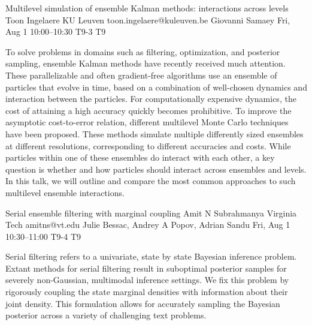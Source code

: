 \begin{talk}
  {Multilevel simulation of ensemble Kalman methods: interactions across levels}%
  {Toon Ingelaere}%
  {KU Leuven}%
  {toon.ingelaere@kuleuven.be}%
  {Giovanni Samaey}%
  {}%
  {Fri, Aug 1 10:00–10:30}%
  {T9-3}%
  {T9}%
  
				

        To solve problems in domains such as filtering, optimization, and posterior sampling,
        ensemble Kalman methods have recently received much attention. These parallelizable and often gradient-free algorithms use an ensemble of particles that evolve in time, based on a combination of well-chosen dynamics and interaction between the particles. For computationally expensive dynamics, the cost of attaining a high accuracy quickly becomes prohibitive. To improve the asymptotic cost-to-error relation, different multilevel Monte Carlo techniques have been proposed. These methods simulate multiple differently sized ensembles at different resolutions, corresponding to different accuracies and costs. While particles within one of these ensembles do interact with each other, a key question is whether and how particles should interact across ensembles and levels.
        In this talk, we will outline and compare the most common approaches to such multilevel ensemble interactions.

\medskip

\end{talk}

\begin{talk}
  {Serial ensemble filtering with marginal coupling}%
  {Amit N Subrahmanya}%
  {Virginia Tech}%
  {amitns@vt.edu}%
  {Julie Bessac, Andrey A Popov, Adrian Sandu}%
  {}%
  {Fri, Aug 1 10:30–11:00}%
  {T9-4}%
  {T9}%
  
				
			
 Serial filtering refers to a univariate, state by state Bayesian inference problem. 
 Extant methods for serial filtering result in suboptimal posterior samples for severely non-Gaussian, multimodal inference settings. 
 We fix this problem by rigorously coupling the state marginal densities with information about their joint density.
 This formulation allows for accurately sampling the Bayesian posterior across a variety of challenging text problems.
 
\medskip

\end{talk}


